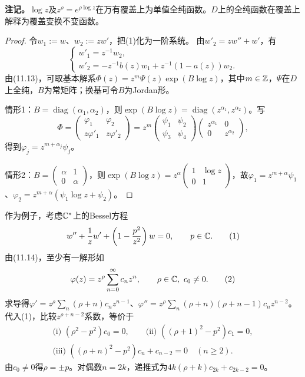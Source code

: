 \textbf{注记。}$\log z$及$z^\rho=e^{\rho\log z}$在万有覆盖上为单值全纯函数。$D$上的全纯函数在覆盖上解释为覆盖变换不变函数。
\begin{proof}
令$w_1:=w$、$w_2:=zw'$，把(1)化为一阶系统。
由$w'_2=zw''+w'$，有
\begin{equation}
\begin{cases}w'_1=z^{-1}w_2,\\w'_2=-z^{-1}b(z)w_1+z^{-1}(1-a(z))w_2.\end{cases}\tag{2}
\end{equation}
由(11.13)，可取基本解系$\Phi(z)=z^m\Psi(z)\exp(B\log z)$，其中$m\in\mathbb Z$，$\Psi$在$D$上全纯，$B$为常矩阵；换基可令$B$为Jordan形。

情形1：$B=\operatorname{diag}(\alpha_1,\alpha_2)$，则$\exp(B\log z)=\operatorname{diag}(z^{\alpha_1},z^{\alpha_2})$。写
\[
\Phi=\begin{pmatrix}\varphi_1&\varphi_2\\z\varphi'_1&z\varphi'_2\end{pmatrix}
=z^m\begin{pmatrix}\psi_1&\psi_2\\\psi_3&\psi_4\end{pmatrix}
\begin{pmatrix}z^{\alpha_1}&0\\0&z^{\alpha_2}\end{pmatrix},
\]
得到$\varphi_j=z^{m+\alpha_j}\psi_j$。

情形2：$B=\begin{pmatrix}\alpha&1\\0&\alpha\end{pmatrix}$，则$\exp(B\log z)=z^\alpha\begin{pmatrix}1&\log z\\0&1\end{pmatrix}$，故$\varphi_1=z^{m+\alpha}\psi_1$、$\varphi_2=z^{m+\alpha}(\psi_1\log z+\psi_2)$。
\end{proof}
作为例子，考虑$\mathbb C^*$上的Bessel方程
\begin{equation}w''+\frac1z w'+\left(1-\frac{p^2}{z^2}\right)w=0,\qquad p\in\mathbb C.\tag{1}\end{equation}
由(11.14)，至少有一解形如
\begin{equation}\varphi(z)=z^\rho\sum_{n=0}^\infty c_nz^n,\qquad \rho\in\mathbb C,\ c_0\ne0.\tag{2}\end{equation}
求导得$\varphi'=z^\rho\sum_n(\rho+n)c_nz^{n-1}$、$\varphi''=z^\rho\sum_n(\rho+n)(\rho+n-1)c_nz^{n-2}$。代入(1)，比较$z^{\rho+n-2}$系数，等价于
\begin{gather*}
\text{(i) }(\rho^2-p^2)c_0=0,\qquad
\text{(ii) }((\rho+1)^2-p^2)c_1=0,\\
\text{(iii) }((\rho+n)^2-p^2)c_n+c_{n-2}=0\quad(n\ge2).
\end{gather*}
由$c_0\ne0$得$\rho=\pm p$。对偶数$n=2k$，递推式为$4k(\rho+k)c_{2k}+c_{2k-2}=0$。

